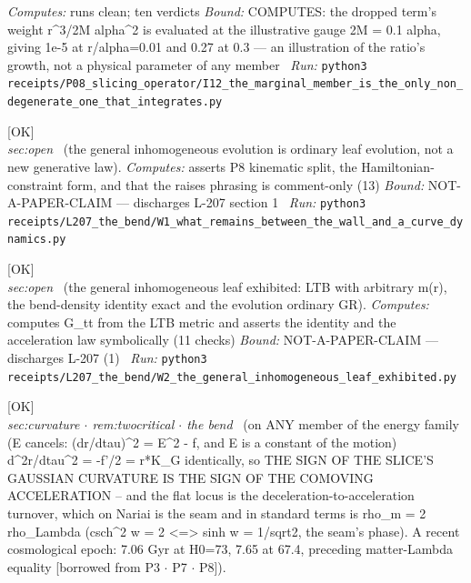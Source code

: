 \begin{description}
\emph{Computes:} runs clean; ten verdicts
 \emph{Bound:} COMPUTES: the dropped term's weight r\textasciicircum{}3/2M alpha\textasciicircum{}2 is evaluated at the illustrative gauge 2M = 0.1 alpha, giving 1e-5 at r/alpha=0.01 and 0.27 at 0.3 --- an illustration of the ratio's growth, not a physical parameter of any member
\ \emph{Run:} \texttt{python3 receipts/P08\_slicing\_operator/I12\_the\_marginal\_member\_is\_the\_only\_non\_degenerate\_one\_that\_integrates.py}
\item[\label{rcpt:W1_what_remains_between_the_wall_and_a_curve_dynamics}\textbf{}\quad\texttt{W1\_what\_remains\_between\_the\_wall\_and\_a\_curve\_dynamics}]\hfill\textsf{[OK]}\\
\textit{sec:open} \ (the general inhomogeneous evolution is ordinary leaf evolution, not a new generative law). 
\emph{Computes:} asserts P8 kinematic split, the Hamiltonian-constraint form, and that the raises phrasing is comment-only (13)
 \emph{Bound:} NOT-A-PAPER-CLAIM --- discharges L-207 section 1
\ \emph{Run:} \texttt{python3 receipts/L207\_the\_bend/W1\_what\_remains\_between\_the\_wall\_and\_a\_curve\_dynamics.py}
\item[\label{rcpt:W2_the_general_inhomogeneous_leaf_exhibited}\textbf{}\quad\texttt{W2\_the\_general\_inhomogeneous\_leaf\_exhibited}]\hfill\textsf{[OK]}\\
\textit{sec:open} \ (the general inhomogeneous leaf exhibited: LTB with arbitrary m(r), the bend-density identity exact and the evolution ordinary GR). 
\emph{Computes:} computes G\_tt from the LTB metric and asserts the identity and the acceleration law symbolically (11 checks)
 \emph{Bound:} NOT-A-PAPER-CLAIM --- discharges L-207 (1)
\ \emph{Run:} \texttt{python3 receipts/L207\_the\_bend/W2\_the\_general\_inhomogeneous\_leaf\_exhibited.py}
\item[\rcptlabel{P03_acceleration_is_slice_curvature}{P3R12}\textbf{P3R12}\quad\texttt{P03\_acceleration\_is\_slice\_curvature}]\hfill\textsf{[OK]}\\
\textit{sec:curvature \ensuremath{\cdot} rem:twocritical \ensuremath{\cdot} the bend} \ (on ANY member of the energy family (E cancels: (dr/dtau)\textasciicircum{}2 = E\textasciicircum{}2 - f, and E is a constant of the motion) d\textasciicircum{}2r/dtau\textasciicircum{}2 = -f'/2 = r*K\_G identically, so THE SIGN OF THE SLICE'S GAUSSIAN CURVATURE IS THE SIGN OF THE COMOVING ACCELERATION -- and the flat locus is the deceleration-to-acceleration turnover, which on Nariai is the seam and in standard terms is rho\_m = 2 rho\_Lambda (csch\textasciicircum{}2 w = 2 <=> sinh w = 1/sqrt2, the seam's phase). A recent cosmological epoch: 7.06 Gyr at H0=73, 7.65 at 67.4, preceding matter-Lambda equality [borrowed from P3 \ensuremath{\cdot} P7 \ensuremath{\cdot} P8]). 

\end{description}
